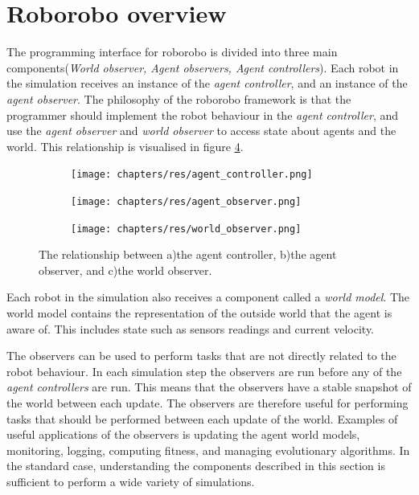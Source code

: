 \section{Roborobo overview}
The programming interface for roborobo is divided into three main components(\emph{World observer, Agent observers, Agent controllers})\cite{bredeche_roborobo!_2013}.
Each robot in the simulation receives an instance of the \emph{agent controller}, and an instance of the \emph{agent observer}.
The philosophy of the roborobo framework is that the programmer should implement the robot behaviour in the \emph{agent controller}, and use the \emph{agent observer} and \emph{world observer} to access state about agents and the world.
This relationship is visualised in figure \ref{fig:component-relationship}.

\begin{figure}[H]
	\centering
	\begin{subfigure}{0.31\textwidth}
		\label{fig:controller}
		\centering
		\hspace*{1.15cm}\texttt{[image: chapters/res/agent\_controller.png]}
		\caption{}
	\end{subfigure}
	\begin{subfigure}{0.31\textwidth}
		\label{fig:agent-observer}
		\centering
		\texttt{[image: chapters/res/agent\_observer.png]}
		\caption{}
	\end{subfigure}
	\begin{subfigure}{0.31\textwidth}
		\label{fig:world-observer}
		\centering
		\texttt{[image: chapters/res/world\_observer.png]}
		\caption{}
	\end{subfigure}
	\caption{The relationship between a)the agent controller, b)the agent observer, and c)the world observer. }
	\label{fig:component-relationship}
\end{figure}

Each robot in the simulation also receives a component called a \emph{world model}.
The world model contains the representation of the outside world that the agent is aware of.
This includes state such as sensors readings and current velocity.

The observers can be used to perform tasks that are not directly related to the robot behaviour.
In each simulation step the observers are run before any of the \emph{agent controllers} are run.
This means that the observers have a stable snapshot of the world between each update.
The observers are therefore useful for performing tasks that should be performed between each update of the world.
Examples of useful applications of the observers is updating the agent world models, monitoring, logging, computing fitness, and managing evolutionary algorithms.
In the standard case, understanding the components described in this section is sufficient to perform a wide variety of simulations.


